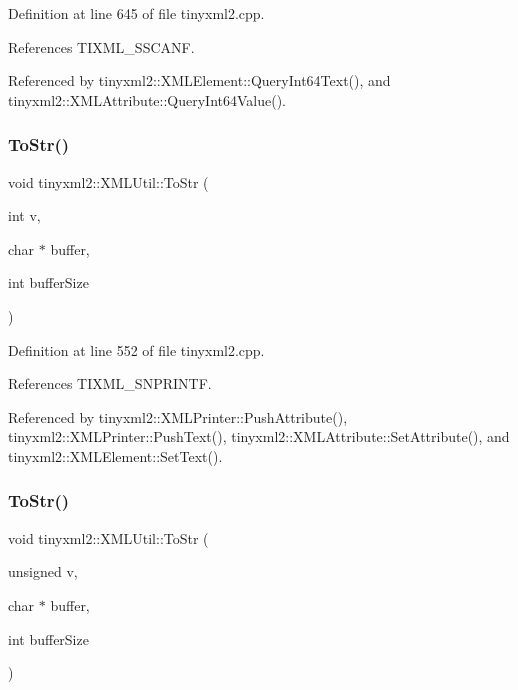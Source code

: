 Definition at line 645 of file tinyxml2.\+cpp.



References T\+I\+X\+M\+L\+\_\+\+S\+S\+C\+A\+NF.



Referenced by tinyxml2\+::\+X\+M\+L\+Element\+::\+Query\+Int64\+Text(), and tinyxml2\+::\+X\+M\+L\+Attribute\+::\+Query\+Int64\+Value().

\mbox{\label{classtinyxml2_1_1_x_m_l_util_a3cd6c703d49b9d51bdf0f4ff6aa021c7}} 
\subsubsection{ToStr()\hspace{0.1cm}{\footnotesize\ttfamily [1/6]}}
{\footnotesize\ttfamily void tinyxml2\+::\+X\+M\+L\+Util\+::\+To\+Str (\begin{DoxyParamCaption}\item[{int}]{v,  }\item[{char $\ast$}]{buffer,  }\item[{int}]{buffer\+Size }\end{DoxyParamCaption})\hspace{0.3cm}{\ttfamily [static]}}



Definition at line 552 of file tinyxml2.\+cpp.



References T\+I\+X\+M\+L\+\_\+\+S\+N\+P\+R\+I\+N\+TF.



Referenced by tinyxml2\+::\+X\+M\+L\+Printer\+::\+Push\+Attribute(), tinyxml2\+::\+X\+M\+L\+Printer\+::\+Push\+Text(), tinyxml2\+::\+X\+M\+L\+Attribute\+::\+Set\+Attribute(), and tinyxml2\+::\+X\+M\+L\+Element\+::\+Set\+Text().

\mbox{\label{classtinyxml2_1_1_x_m_l_util_ac00c2e52c1c36dab3ff41d86a9bf60f9}} 
\subsubsection{ToStr()\hspace{0.1cm}{\footnotesize\ttfamily [2/6]}}
{\footnotesize\ttfamily void tinyxml2\+::\+X\+M\+L\+Util\+::\+To\+Str (\begin{DoxyParamCaption}\item[{unsigned}]{v,  }\item[{char $\ast$}]{buffer,  }\item[{int}]{buffer\+Size }\end{DoxyParamCaption})\hspace{0.3cm}{\ttfamily [static]}}



